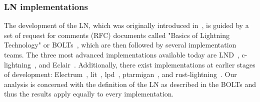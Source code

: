 %

\subsubsection*{LN implementations} 
The development of the LN, which was originally introduced in~\cite{Poon2016}, is guided by a set of request for comments (RFC) documents called "Basics of Lightning Technology" or BOLTs~\cite{BOLT}, 
which are then followed by several implementation teams.
The three most advanced implementations available today are LND~\cite{LND}, 
c-lightning~\cite{clightning}, and Eclair~\cite{Eclair}.
Additionally, there exist implementations at earlier stages of development:
Electrum~\cite{ElectrumWebsite, ElectrumLightningAnnounce}, lit~\cite{lit}, lpd~\cite{lpd}, ptarmigan~\cite{ptarmigan}, and rust-lightning~\cite{rustlightning}.
Our analysis is concerned with the definition of the LN as described in the BOLTs and thus the results 
apply equally to every implementation. 

